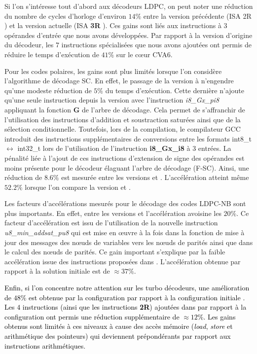 \documentclass[../main.tex]{subfiles}
\begin{document}
Si l'on s'intéresse tout d'abord aux décodeurs LDPC, on peut noter une réduction du nombre de cycles d'horloge d'environ  $14\%$ entre la version précédente (ISA 2R ) et la version actuelle (ISA \textbf{3R} ). 
Ces gains sont liés aux instructions à $3$ opérandes d'entrée que nous avons développées.
Par rapport à la version d'origine du décodeur, les $7$ instructions spécialisées que nous avons ajoutées ont permis de réduire le temps d'exécution de $41\%$ sur le cœur CVA6.


Pour les codes polaires, les gains sont plus limités lorsque l'on considère l'algorithme de décodage SC. 
En effet, le passage de la version  à  n'engendre qu'une modeste réduction de $5\%$ du temps d'exécution. 
Cette dernière n'ajoute qu'une seule instruction depuis la version  avec l'instruction \textit{i8\_Gx\_pi8} appliquant la fonction \textbf{G} de l'arbre de décodage.
Cela permet de s'affranchir de l'utilisation des instructions d'addition et soustraction saturées ainsi que de la sélection conditionnelle. 
Toutefois, lors de la compilation, le compilateur GCC introduit des instructions supplémentaires de conversions entre les formats int8\_t $\leftrightarrow$ int32\_t lors de l'utilisation de l'instruction \textbf{i8\_Gx\_i8} à 3 entrées.
La pénalité liée à l'ajout de ces instructions d'extension de signe des opérandes est moins présente pour le décodeur élaguant l'arbre de décodage (F-SC).
Ainsi, une réduction de $8.6\%$ est mesurée entre les versions  et .
L'accélération atteint même $52.2\%$ lorsque l'on compare la version  et .


Les facteurs d'accélérations mesurés pour le décodage des codes LDPC-NB sont plus importants.
En effet, entre les versions  et  l'accélération avoisine les $20\%$.
Ce facteur d'accélération est issu de l'utilisation de la nouvelle instruction \textit{u8\_min\_addsat\_pu8} qui est mise en œuvre à la fois dans la fonction de mise à jour des messages des nœuds de variables vers les nœuds de parités ainsi que dans le calcul des nœuds de parités.
Ce gain important s'explique par la faible accélération issue des instructions proposées dans .
L'accélération obtenue par rapport à la solution initiale  est de $\approx 37\%$.

\textcolor{black}{Enfin, si l'on concentre notre attention sur les turbo décodeurs, une amélioration de $48\%$ est obtenue par la configuration  par rapport à la configuration initiale . 
Les $4$ instructions (ainsi que les instructions \textbf{2R}) ajoutées dans  par rapport à la configuration  ont permis une réduction supplémentaire de $\approx 12\%$.
Les gains obtenus sont limités à ces niveaux à cause des accès mémoire (\textit{load}, \textit{store} et arithmétique des pointeurs) qui deviennent prépondérants par rapport aux instructions arithmétiques.}
\end{document}
